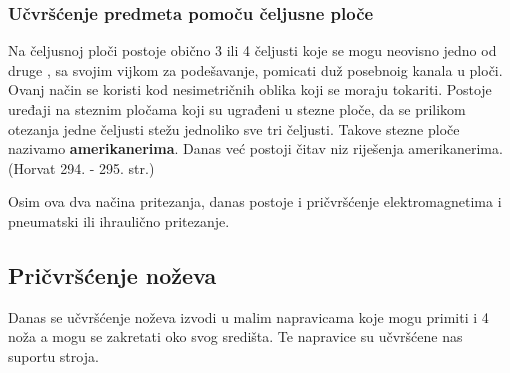 \documentclass[a4paper,12pt]{article}
\numberwithin{figure}{section}
\begin{document}
\subsubsection{Učvršćenje predmeta pomoču čeljusne ploče}
Na čeljusnoj ploči
 postoje obično 3 ili 4 čeljusti koje se mogu neovisno jedno od druge , sa svojim vijkom za podešavanje, pomicati duž posebnoig kanala u ploči. Ovanj način se koristi kod nesimetričnih oblika koji se moraju tokariti. Postoje uređaji na steznim pločama koji su ugrađeni u stezne ploče, da se prilikom otezanja  jedne čeljusti stežu jednoliko sve tri čeljusti. Takove stezne ploče nazivamo \textbf{amerikanerima}. Danas već postoji čitav niz riješenja amerikanerima. (Horvat 294. - 295. str.)\par
Osim ova dva načina pritezanja, danas postoje i pričvršćenje elektromagnetima i pneumatski ili ihraulično pritezanje.
\subsection{Pričvršćenje noževa}
Danas se učvršćenje noževa izvodi u malim napravicama koje mogu primiti i 4 noža a mogu se zakretati oko svog središta. Te napravice su učvršćene nas suportu stroja.
\end{document}

